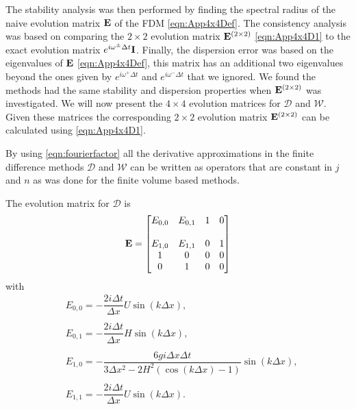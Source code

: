 The stability analysis was then performed by finding the spectral radius of the naive evolution matrix $\mathbf{E}$ of the FDM \eqref{eqn:App4x4Def}. The consistency analysis was based on comparing the $2\times2$ evolution matrix $\mathbf{E}^{\left(2 \times 2\right)}$ \eqref{eqn:App4x4D1} to the exact evolution matrix $e^{i \omega^\pm \Delta t}\mathbf{I} $. Finally, the dispersion error was based on the eigenvalues of $\mathbf{E}$ \eqref{eqn:App4x4Def}, this matrix has an additional two eigenvalues beyond the ones given by $e^{i \omega^+ \Delta t}$ and $e^{i \omega^- \Delta t}$ that we ignored. We found the methods had the same stability and dispersion properties when $\mathbf{E}^{\left(2 \times 2\right)}$ was investigated. We will now present the $4\times4$ evolution matrices for $\mathcal{D}$ and $\mathcal{W}$. Given these matrices the corresponding $2\times 2$ evolution matrix $\mathbf{E}^{\left(2 \times 2\right)}$ can be calculated using \eqref{eqn:App4x4D1}.



By using \eqref{eqn:fourierfactor} all the derivative approximations in the finite difference methods $\mathcal{D}$ and $\mathcal{W}$ can be written as operators that are constant in $j$ and $n$ as was done for the finite volume based methods.

The evolution matrix for $\mathcal{D}$ is 
 \begin{equation}
\label{eqn:AppEvolD}
\mathbf{E} = \begin{bmatrix}
{E}_{0,0} & {E}_{0,1}  & 1 &0 \\ \\
{E}_{1,0} & {E}_{1,1}  & 0 &1 \\
1  & 0  &0 &0 \\
0  & 1  &0 &0 
\end{bmatrix} 
\end{equation}
with
\begin{align*}
&{E}_{0,0} = -  \dfrac{2 i\Delta t }{\Delta x} U\sin\left(k \Delta x\right) , \\ \\
&{E}_{0,1} = -  \dfrac{2 i\Delta t}{\Delta x} H \sin\left(k \Delta x\right),\\ \\
& {E}_{1,0} =-\dfrac{6 gi \Delta x\Delta t}{3 \Delta x^2 -2{H^2} \left( \cos\left(k \Delta x\right) - 1 \right)}{ \sin\left(k \Delta x\right)}, \\\\
& {E}_{1,1} =-\dfrac{2i \Delta t }{\Delta x} U \sin\left(k \Delta x\right).
\end{align*}



